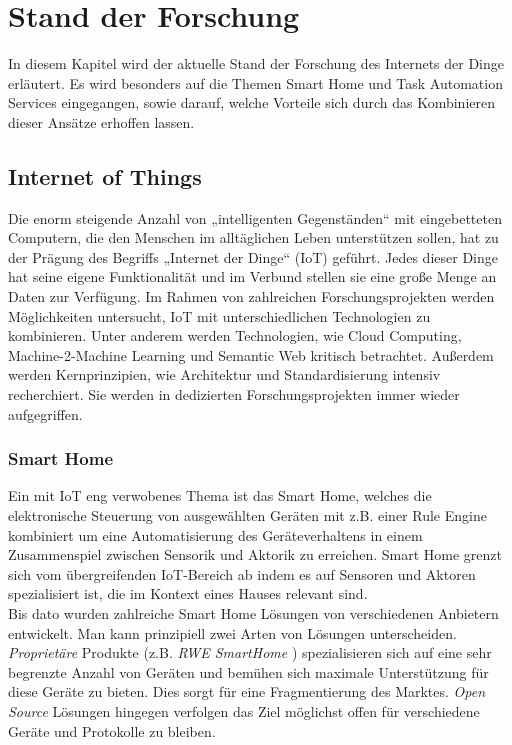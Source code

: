 \chapter{Stand der Forschung}
In diesem Kapitel wird der aktuelle Stand der Forschung des Internets der Dinge erläutert. Es wird besonders auf die Themen Smart Home und Task Automation Services eingegangen, sowie darauf, welche Vorteile sich durch das Kombinieren dieser Ansätze erhoffen lassen.


\section{Internet of Things}
Die enorm steigende Anzahl von „intelligenten Gegenständen“ mit eingebetteten Computern, die den Menschen im alltäglichen Leben unterstützen sollen, hat zu der Prägung des Begriffs „Internet der Dinge“ (IoT) geführt. Jedes dieser Dinge hat seine eigene Funktionalität und im Verbund stellen sie eine große Menge an Daten zur Verfügung. Im Rahmen von zahlreichen Forschungsprojekten \cite{ierc:portfolios} werden Möglichkeiten untersucht, IoT mit unterschiedlichen Technologien zu kombinieren. Unter anderem werden Technologien, wie Cloud Computing\cite{FiCloud:CloudIot}, Machine-2-Machine Learning\cite{FiCloud:M3Iot} und Semantic Web\cite{SemWebIoT} kritisch betrachtet. Außerdem werden Kernprinzipien, wie Architektur und Standardisierung intensiv recherchiert. Sie werden in dedizierten Forschungsprojekten \cite{icore:achitecture}\cite{iota:d25} immer wieder aufgegriffen.


\subsection{Smart Home}
Ein mit IoT eng verwobenes Thema ist das Smart Home\cite{SmartHomeIoT}, welches die elektronische Steuerung von ausgewählten Geräten mit z.B. einer Rule Engine kombiniert um eine Automatisierung des Geräteverhaltens in einem Zusammenspiel zwischen Sensorik und Aktorik zu erreichen. Smart Home grenzt sich vom übergreifenden IoT-Bereich ab indem es auf Sensoren und Aktoren spezialisiert ist, die im Kontext eines Hauses relevant sind.\\

Bis dato wurden zahlreiche Smart Home Lösungen von verschiedenen Anbietern entwickelt. Man kann prinzipiell zwei Arten von Lösungen unterscheiden. \textit{Proprietäre} Produkte (z.B. \textit{RWE SmartHome} \cite{RWE}) spezialisieren sich auf eine sehr begrenzte Anzahl von Geräten und bemühen sich maximale Unterstützung für diese Geräte zu bieten. Dies sorgt für eine Fragmentierung des Marktes. \textit{Open Source} Lösungen hingegen verfolgen das Ziel möglichst offen für verschiedene Geräte und Protokolle zu bleiben.\\ 

